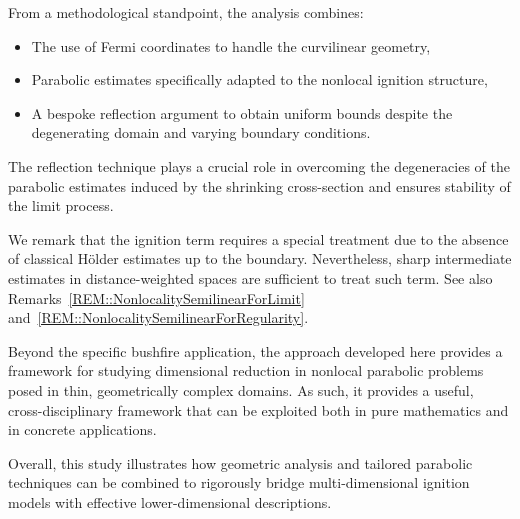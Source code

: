 \documentclass[12pt,a4paper]{amsart}
\numberwithin{equation}{section}
\theoremstyle{definition}
\theoremstyle{remark}
\begin{document}
{F}rom a methodological standpoint, the analysis combines:
\begin{itemize}
\item The use of Fermi coordinates to handle the curvilinear geometry,
\item Parabolic estimates specifically adapted to the nonlocal ignition structure,
\item A bespoke reflection argument to obtain uniform bounds despite the degenerating domain and varying boundary conditions.\end{itemize}

The reflection technique plays a crucial role in overcoming the degeneracies of the parabolic estimates induced by the shrinking cross-section and ensures stability of the limit process.

We remark that the ignition term requires a special treatment due to the absence of classical Hölder estimates up to the boundary. Nevertheless, sharp intermediate estimates in distance-weighted spaces are sufficient to treat such term. See also Remarks~\ref{REM::NonlocalitySemilinearForLimit} and~\ref{REM::NonlocalitySemilinearForRegularity}.

Beyond the specific bushfire application, the approach developed here provides a framework for studying dimensional reduction in nonlocal parabolic problems posed in thin, geometrically complex domains. As such, it provides a useful, cross-disciplinary framework that can be exploited both in pure mathematics and in concrete applications.

Overall, this study illustrates how geometric analysis and tailored parabolic techniques can be combined to rigorously bridge multi-dimensional ignition models with effective lower-dimensional descriptions.
\end{document}
